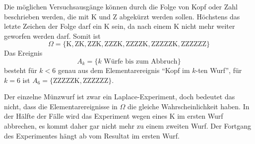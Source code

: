 \begin{loesung}
\begin{teilaufgaben}
\item
Die möglichen Versuchsausgänge können durch die Folge von Kopf oder Zahl
beschrieben werden, die mit K und Z abgekürzt werden sollen.
Höchstens das letzte Zeichen der Folge darf ein K sein, da nach einem
K nicht mehr weiter geworfen werden darf.
Somit ist
\[
\Omega = \{
\text{K},
\text{ZK},
\text{ZZK},
\text{ZZZK},
\text{ZZZZK},
\text{ZZZZZK},
\text{ZZZZZZ}
\}
\]
Das Ereignis 
\[
A_k=\{
\text{$k$ Würfe bis zum Abbruch}
\}
\]
besteht für $k<6$ genau aus dem Elementarereignis ``Kopf im $k$-ten Wurf'',
für $k=6$ ist $A_6= \{\text{ZZZZZK}, \text{ZZZZZZ}\}$.
\item
Der einzelne Münzwurf ist zwar ein Laplace-Experiment, doch bedeutet das
nicht, dass die Elementarereignisse in $\Omega$ die gleiche Wahrscheinlichkeit
haben.
In der Hälfte der Fälle wird das Experiment wegen eines K im ersten Wurf abbrechen,
es kommt daher gar nicht mehr zu einem zweiten Wurf.
Der Fortgang des Experimentes hängt ab vom Resultat im ersten Wurf.


\end{teilaufgaben}
\end{loesung}
